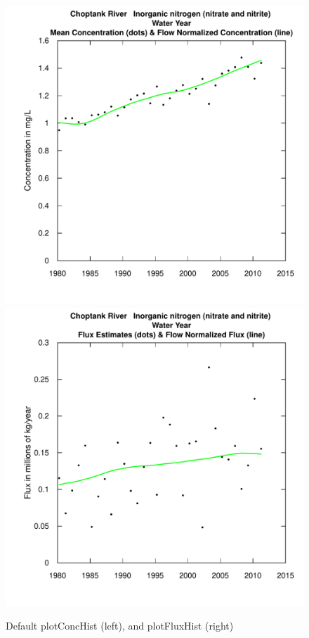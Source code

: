 \documentclass[a4paper,11pt]{article}\usepackage{graphicx, color}
\newenvironment{knitrout}{}{} %
\begin{document}
\begin{knitrout}
\color{fgcolor}\begin{figure}[]

\includegraphics[width=.5\linewidth,height=.5\linewidth]{figure/plotFluxHist1} 
\includegraphics[width=.5\linewidth,height=.5\linewidth]{figure/plotFluxHist2} \caption[Default plotConcHist (left), and plotFluxHist (right)]{Default plotConcHist (left), and plotFluxHist (right)\label{fig:plotFluxHist}}
\end{figure}


\end{knitrout}
\end{document}

